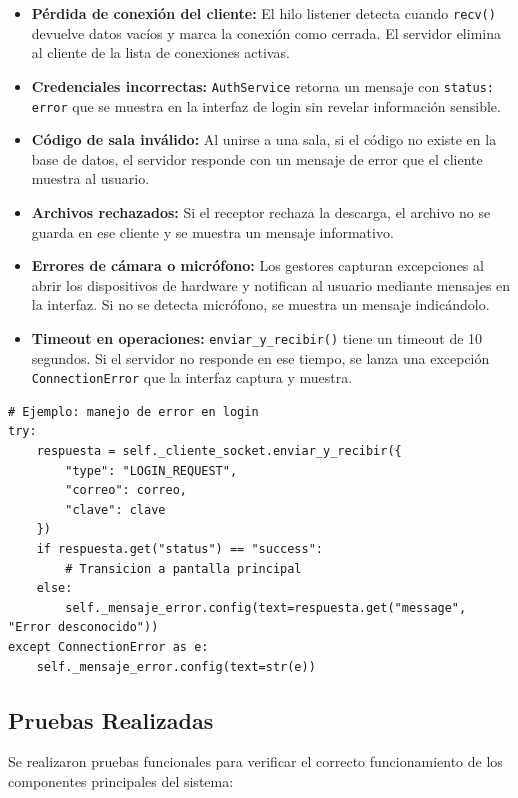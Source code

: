 \documentclass[12pt,a4paper]{article}
\begin{document}
\begin{itemize}
    \item \textbf{P\'erdida de conexi\'on del cliente:} El hilo listener detecta cuando \texttt{recv()} devuelve datos vac\'ios y marca la conexi\'on como cerrada. El servidor elimina al cliente de la lista de conexiones activas.
    \item \textbf{Credenciales incorrectas:} \texttt{AuthService} retorna un mensaje con \texttt{status: error} que se muestra en la interfaz de login sin revelar informaci\'on sensible.
    \item \textbf{C\'odigo de sala inv\'alido:} Al unirse a una sala, si el c\'odigo no existe en la base de datos, el servidor responde con un mensaje de error que el cliente muestra al usuario.
    \item \textbf{Archivos rechazados:} Si el receptor rechaza la descarga, el archivo no se guarda en ese cliente y se muestra un mensaje informativo.
    \item \textbf{Errores de c\'amara o micr\'ofono:} Los gestores capturan excepciones al abrir los dispositivos de hardware y notifican al usuario mediante mensajes en la interfaz. Si no se detecta micr\'ofono, se muestra un mensaje indic\'andolo.
    \item \textbf{Timeout en operaciones:} \texttt{enviar\_y\_recibir()} tiene un timeout de 10 segundos. Si el servidor no responde en ese tiempo, se lanza una excepci\'on \texttt{ConnectionError} que la interfaz captura y muestra.
\end{itemize}

\begin{lstlisting}
# Ejemplo: manejo de error en login
try:
    respuesta = self._cliente_socket.enviar_y_recibir({
        "type": "LOGIN_REQUEST",
        "correo": correo,
        "clave": clave
    })
    if respuesta.get("status") == "success":
        # Transicion a pantalla principal
    else:
        self._mensaje_error.config(text=respuesta.get("message", "Error desconocido"))
except ConnectionError as e:
    self._mensaje_error.config(text=str(e))
\end{lstlisting}

\subsection{Pruebas Realizadas}

Se realizaron pruebas funcionales para verificar el correcto funcionamiento de los componentes principales del sistema:
\end{document}

